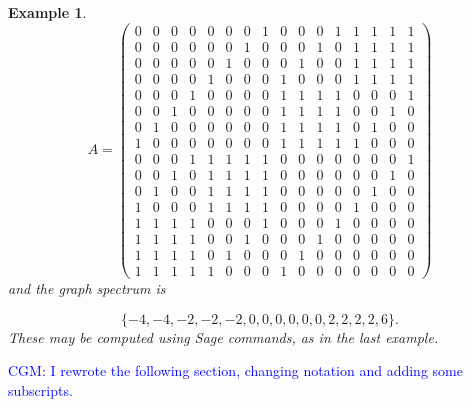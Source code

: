 \documentclass[12pt]{article}
\def\blue#1{\textcolor{blue}{#1}}
\newcommand{\cgm}[1]{\blue{CGM: #1}}
\newcommand{\cgm}[1]{}
\newtheorem{example}[theorem]{Example}
\newcommand{\Hcal}{{\mathcal{H}}}
\begin{document}
\begin{example}
{\small{
\[
A =
\left(\begin{array}{rrrrrrrrrrrrrrrr}
0 & 0 & 0 & 0 & 0 & 0 & 0 & 1 & 0 & 0 & 0 & 1 & 1 & 1 & 1 & 1 \\
0 & 0 & 0 & 0 & 0 & 0 & 1 & 0 & 0 & 0 & 1 & 0 & 1 & 1 & 1 & 1 \\
0 & 0 & 0 & 0 & 0 & 1 & 0 & 0 & 0 & 1 & 0 & 0 & 1 & 1 & 1 & 1 \\
0 & 0 & 0 & 0 & 1 & 0 & 0 & 0 & 1 & 0 & 0 & 0 & 1 & 1 & 1 & 1 \\
0 & 0 & 0 & 1 & 0 & 0 & 0 & 0 & 1 & 1 & 1 & 1 & 0 & 0 & 0 & 1 \\
0 & 0 & 1 & 0 & 0 & 0 & 0 & 0 & 1 & 1 & 1 & 1 & 0 & 0 & 1 & 0 \\
0 & 1 & 0 & 0 & 0 & 0 & 0 & 0 & 1 & 1 & 1 & 1 & 0 & 1 & 0 & 0 \\
1 & 0 & 0 & 0 & 0 & 0 & 0 & 0 & 1 & 1 & 1 & 1 & 1 & 0 & 0 & 0 \\
0 & 0 & 0 & 1 & 1 & 1 & 1 & 1 & 0 & 0 & 0 & 0 & 0 & 0 & 0 & 1 \\
0 & 0 & 1 & 0 & 1 & 1 & 1 & 1 & 0 & 0 & 0 & 0 & 0 & 0 & 1 & 0 \\
0 & 1 & 0 & 0 & 1 & 1 & 1 & 1 & 0 & 0 & 0 & 0 & 0 & 1 & 0 & 0 \\
1 & 0 & 0 & 0 & 1 & 1 & 1 & 1 & 0 & 0 & 0 & 0 & 1 & 0 & 0 & 0 \\
1 & 1 & 1 & 1 & 0 & 0 & 0 & 1 & 0 & 0 & 0 & 1 & 0 & 0 & 0 & 0 \\
1 & 1 & 1 & 1 & 0 & 0 & 1 & 0 & 0 & 0 & 1 & 0 & 0 & 0 & 0 & 0 \\
1 & 1 & 1 & 1 & 0 & 1 & 0 & 0 & 0 & 1 & 0 & 0 & 0 & 0 & 0 & 0 \\
1 & 1 & 1 & 1 & 1 & 0 & 0 & 0 & 1 & 0 & 0 & 0 & 0 & 0 & 0 & 0
\end{array}\right)
\]
}}
and the graph spectrum is

\[
\{ -4, -4, -2, -2, -2, 0, 0, 0, 0, 0, 0, 2, 2, 2, 2, 6\}.
\]
These may be computed using Sage commands, as in the last example.


\end{example}



\cgm{I rewrote the following section, changing notation and adding some subscripts.}
\end{document}

